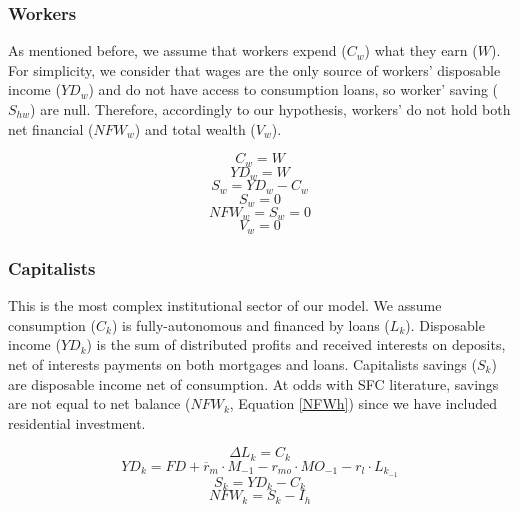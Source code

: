 \documentclass[12pt]{article}
\begin{document}
\subsubsection{Workers}
\label{sec:org715c9b2}

As mentioned before, we assume that workers expend (\(C_w\)) what they earn (\(W\)). 
For simplicity, we consider that wages are the only source of workers' disposable income (\(YD_{w}\)) and do not have access to consumption loans, so worker' saving (\(S_{hw}\)) are null.
Therefore, accordingly to our hypothesis, workers' do not hold both net financial (\(NFW_{w}\)) and total wealth (\(V_{w}\)).

\begin{equation}
C_w = W
\end{equation}
\begin{equation}
YD_w = W
\end{equation}
\begin{equation}
S_{w} = YD_w - C_w
\end{equation}
$$
S_{w} = 0
$$
\begin{equation}
NFW_{w} = S_{w} = 0
\end{equation}
\begin{equation}
V_{w} = 0
\end{equation}

\subsubsection{Capitalists}
\label{sec:orge34d326}

This is the most complex institutional sector of our model. 
We assume consumption (\(C_k\)) is fully-autonomous and financed by loans (\(L_{k}\)). 
Disposable income (\(YD_k\)) is the sum of distributed profits and received interests on deposits, net of interests payments
on both mortgages and loans.
Capitalists savings (\(S_{k}\)) are disposable income net of consumption.
At odds with SFC literature, savings are not equal to net balance (\(NFW_{k}\), Equation \ref{NFWh}) since we have included residential investment.

\begin{equation}
\Delta L_{k} = C_k
\end{equation}
\begin{equation}
    \label{EqYD}
    YD_k = FD + \overline r_m\cdot M_{-1} - r_{mo}\cdot MO_{-1} - r_{l}\cdot L_{k_{-1}}
\end{equation}
\begin{equation}
    \label{EqSh}
    S_{k} = YD_k - C_k
\end{equation}
\begin{equation}
\label{NFWh}
    NFW_{k} = S_{k} - I_h
\end{equation}
\end{document}
